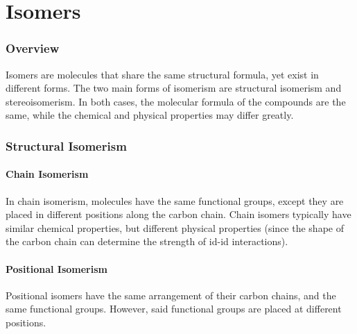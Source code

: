 

\pagebreak
\hypertarget{ChapterIsomers}{}
\part{Isomers}

	\section{Overview}

	Isomers are molecules that share the same structural formula, yet exist in different forms. The two main
	forms of isomerism are structural isomerism and stereoisomerism. In both cases, the molecular formula of the
	compounds are the same, while the chemical and physical properties may differ greatly.


	\section{Structural Isomerism}

		\subsection{Chain Isomerism}

			In chain isomerism, molecules have the same functional groups, except they are placed in different positions
			along the carbon chain. Chain isomers typically have similar chemical properties, but different physical
			properties (since the shape of the carbon chain can determine the strength of id-id interactions).





		\subsection{Positional Isomerism}
			Positional isomers have the same arrangement of their carbon chains, and the same functional groups. However, said
			functional groups are placed at different positions.



